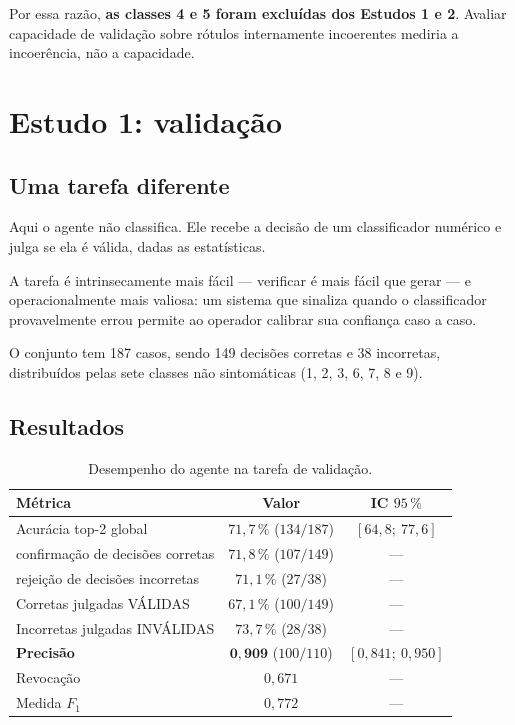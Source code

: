 Por essa razão, \textbf{as classes 4 e 5 foram excluídas dos Estudos 1 e 2}. Avaliar
capacidade de validação sobre rótulos internamente incoerentes mediria a incoerência,
não a capacidade.

\section{Estudo 1: validação}

\subsection{Uma tarefa diferente}

Aqui o agente não classifica. Ele recebe a decisão de um classificador numérico e julga
se ela é válida, dadas as estatísticas.

A tarefa é intrinsecamente mais fácil --- verificar é mais fácil que gerar --- e
operacionalmente mais valiosa: um sistema que sinaliza quando o classificador
provavelmente errou permite ao operador calibrar sua confiança caso a caso.

O conjunto tem 187 casos, sendo 149 decisões corretas e 38 incorretas, distribuídos
pelas sete classes não sintomáticas (1, 2, 3, 6, 7, 8 e 9).

\subsection{Resultados}

\begin{table}[htbp]
\centering
\caption{Desempenho do agente na tarefa de validação.}
\label{tab:ag-validacao}
\small
\begin{tabular}{lcc}
\toprule
\textbf{Métrica} & \textbf{Valor} & \textbf{IC $95\,\%$} \\
\midrule
Acurácia top-2 global                & $71{,}7\,\%$ ($134/187$) & $[64{,}8;\ 77{,}6]$ \\
\quad confirmação de decisões corretas & $71{,}8\,\%$ ($107/149$) & --- \\
\quad rejeição de decisões incorretas  & $71{,}1\,\%$ ($27/38$)   & --- \\
\midrule
Corretas julgadas VÁLIDAS            & $67{,}1\,\%$ ($100/149$) & --- \\
Incorretas julgadas INVÁLIDAS        & $73{,}7\,\%$ ($28/38$)   & --- \\
\midrule
\textbf{Precisão}                    & $\bm{0{,}909}$ ($100/110$) & $[0{,}841;\ 0{,}950]$ \\
Revocação                            & $0{,}671$ & --- \\
Medida $F_1$                         & $0{,}772$ & --- \\
\bottomrule
\end{tabular}
\end{table}

